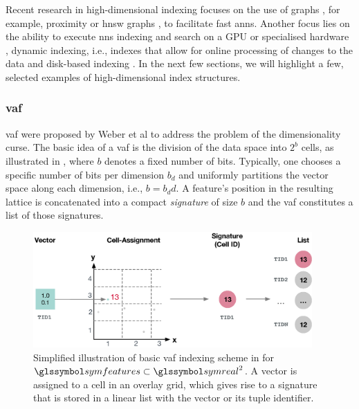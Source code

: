 Recent research in high-dimensional indexing focuses on the use of graphs \cite{Shimomura:2021Survey}, for example, proximity \cite{Zhao:2022Approximate} or \acrfull{hnsw} graphs \cite{Malkov:2018Efficient,Chen:2021SPANN}, to facilitate fast \acrshort{anns}. Another focus lies on the ability to execute \acrshort{nns} indexing and search on a GPU \cite{Johnson:2019Billion,Zhao:2020Song} or specialised hardware \cite{Lee:2022Anna}, dynamic indexing, i.e., indexes that allow for online processing of changes to the data \cite{Olafsson:2011Dynamic,Zhao:2022Approximate} and disk-based indexing \cite{Jayaram:2019DiskANN}. In the next few sections, we will highlight a few, selected examples of high-dimensional index structures.

\subsubsection{\texorpdfstring{\acrfull{vaf}}{Vector Approximation File (VAF)}}
\label{section:index_vaf}

\acrfull{vaf} were proposed by Weber et al \cite{Weber:1998Va} to address the problem of the dimensionality curse. The basic idea of a \acrshort{vaf} is the division of the data space into $2^b$ cells, as illustrated in , where $b$ denotes a fixed number of bits. Typically, one chooses a specific number of bits per dimension $b_d$ and uniformly partitions the vector space along each dimension, i.e., $b = b_dd$. A feature's position in the resulting lattice is concatenated into a compact \emph{signature} of size $b$ and the \acrshort{vaf} constitutes a list of those signatures. 

\begin{figure}[tb]
\centering
\includegraphics[width=0.95\textwidth]{figures/vaf}
\caption{Simplified illustration of basic \acrshort{vaf} indexing scheme in for $\symfeatures \subset \symreal^2$. A vector is assigned to a cell in an overlay grid, which gives rise to a signature that is stored in a linear list with the vector or its tuple identifier.}
\label{fig:vaf}
\end{figure}

